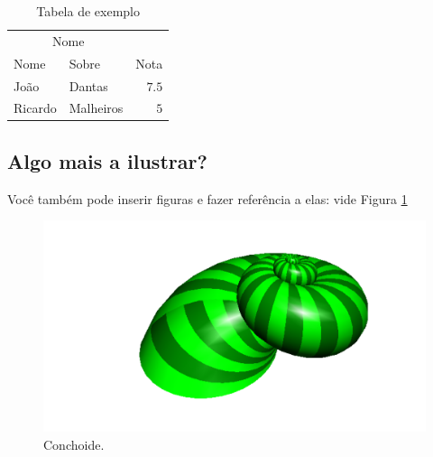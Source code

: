 \documentclass[10pt, a4paper, twocolumn]{article}
\begin{document}
\lipsum[1]

\begin{table}
	\label{tab:tabela}
	\caption{Tabela de exemplo}
	\centering
	\begin{tabular}{llr}
		\toprule
		\multicolumn{2}{c}{Nome} \\
		\cmidrule(r){1-2}
		Nome & Sobre & Nota \\
		\midrule
		João & Dantas & $7.5$ \\
		Ricardo & Malheiros & $5$ \\
		\bottomrule
	\end{tabular}
\end{table}


\subsection*{Algo mais a ilustrar?}

Você também pode inserir figuras e fazer referência a elas: vide Figura \ref{fig:conchoide}

\begin{figure}
	\includegraphics[width=\linewidth]{conchoide} %
	\caption{Conchoide.} %
	\label{fig:conchoide} %
\end{figure}

\lipsum[1]

\printbibliography[title={Referências}] %
\end{document}
